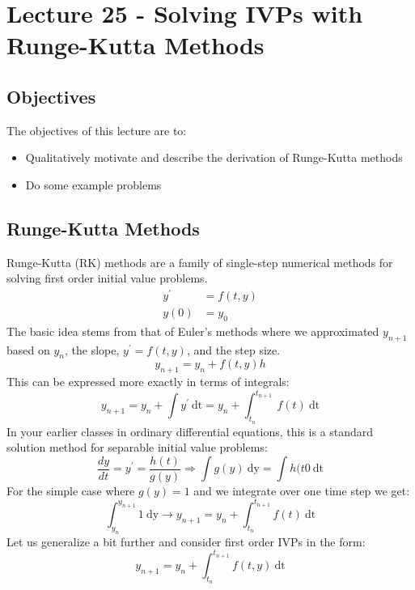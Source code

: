 \chapter{Lecture 25 - Solving IVPs with Runge-Kutta Methods}
\label{ch:lec25n}
\section{Objectives}
The objectives of this lecture are to:
\begin{itemize}
\item Qualitatively motivate and describe the derivation of Runge-Kutta methods
\item Do some example problems
\end{itemize}
\setcounter{lstannotation}{0}

\section{Runge-Kutta Methods}
Runge-Kutta (RK) methods are a family of single-step numerical methods for solving first order initial value problems.
\begin{align*}
y^{\prime} &= f(t,y) \\
y(0) &= y_0
\end{align*}
The basic idea stems from that of Euler's methods where we approximated $y_{n+1}$ based on $y_n$, the slope, $y^{\prime}=f(t,y)$, and the step size.
\begin{equation*}
y_{n+1} = y_n + f(t,y)h
\end{equation*}
This can be expressed more exactly in terms of integrals:
\begin{equation*}
y_{n+1}=y_n+\int y^{\prime} \ \text{dt} = y_n+\int_{t_{n}}^{t_{n+1}} \ f(t) \ \text{dt}
\end{equation*}
In your earlier classes in ordinary differential equations, this is a standard solution method for separable initial value problems:
\begin{equation*}
\frac{dy}{dt} = y^{\prime} = \frac{h(t)}{g(y)} \Rightarrow \int g(y) \ \text{dy} = \int h(t0 \ \text{dt}
\end{equation*}
For the simple case where $g(y) = 1$ and we integrate over one time step we get:
\begin{equation*}
\int_{y_{n}}^{y_{n+1}} 1 \ \text{dy} \rightarrow y_{n+1} = y_n + \int_{t_n}^{t_{n+1}} f(t)\ \text{dt}
\end{equation*}
Let us generalize a bit further and consider first order IVPs in the form:
\begin{equation}
y_{n+1} = y_n + \int_{t_n}^{t_{n+1}} f(t,y) \ \text{dt}
\label{eq:lec25n-1}
\end{equation}

